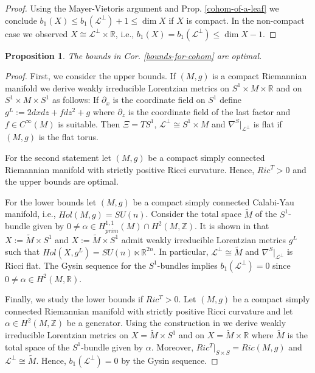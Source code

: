 \documentclass[a4paper,10pt,twoside]{amsart}
\newtheorem{proposition}[theorem]{Proposition}
\theoremstyle{definition}
\theoremstyle{remark}
\numberwithin{equation}{section}
\begin{document}
\begin{proof}
	Using the Mayer-Vietoris argument and Prop. \ref{cohom-of-a-leaf} we conclude $b_{1}(X) \leq b_{1}(\mathcal{L}^{\perp}) + 1 \leq \dim X$ if $X$
	is compact. In the non-compact case we observed $X \cong \mathcal{L}^{\perp} \times {\mathbb{R}}$, i.e.,
	$b_{1}(X) = b_{1}(\mathcal{L}^{\perp}) \leq \dim X -1$.
\end{proof}
\begin{proposition}
	The bounds in Cor. \ref{bounds-for-cohom} are optimal.
\end{proposition}
\begin{proof}
	First, we consider the upper bounds. If $(M,g)$ is a compact Riemannian manifold we derive weakly irreducible Lorentzian metrics on
	$S^{1} \times M \times {\mathbb{R}}$ and on $S^{1} \times M \times S^{1}$ as follows: If $\partial_{x}$ is the coordinate field on $S^{1}$ define
	$g^{L}:= 2dxdz +fdz^{2} + g$ where $\partial_{z}$ is the coordinate field of the last factor and $f \in C^{\infty}(M)$ is suitable.
	Then $\Xi = TS^{1}$, $\mathcal{L}^{\perp} \cong S^{1} \times M$ and $\nabla^{S}|_{\mathcal{L}^{\perp}}$ is flat if $(M,g)$ is the flat torus.\par
	For the second statement let $(M,g)$ be a compact simply connected Riemannian manifold with strictly positive Ricci curvature. Hence,
	$Ric^{T} > 0$ and the upper bounds are optimal.\par
	For the lower bounds let $(M,g)$ be a compact simply connected Calabi-Yau manifold, i.e., $Hol(M,g)=SU(n)$. Consider the total space
	$\tilde{M}$ of the $S^{1}$-bundle given by $0 \neq \alpha \in H^{1,1}_{prim}(M)\cap H^{2}(M,{\mathbb{Z}})$. It is shown in \cite[Cor. 4.4]{laerz-2008-a}
	that $X:= \tilde{M} \times S^{1}$ and $X:= \tilde{M} \times S^{1}$ admit weakly irreducible Lorentzian metrics $g^{L}$ such that
	$Hol(X,g^{L})= SU(n) \ltimes {\mathbb{R}}^{2n}$. In particular, $\mathcal{L}^{\perp} \cong \tilde{M}$ and $\nabla^{S}|_{\mathcal{L}^{\perp}}$ is Ricci
	flat. The Gysin sequence for the $S^{1}$-bundles implies $b_{1}(\mathcal{L}^{\perp})=0$ since $0 \neq \alpha \in H^{2}(M,{\mathbb{R}})$.\par
	Finally, we study the lower bounds if $Ric^{T}>0$. Let $(M,g)$ be a compact simply connected Riemannian manifold with strictly positive Ricci
	curvature and let $\alpha \in H^{2}(M,{\mathbb{Z}})$ be a generator. Using the construction in \cite{laerz-2008-a} we derive weakly irreducible Lorentzian
	metrics on $X= \tilde{M} \times S^{1}$ and on $X=\tilde{M} \times {\mathbb{R}}$ where $\tilde{M}$ is the total space of the $S^{1}$-bundle given by
	$\alpha$. Moreover, $Ric^{T}|_{S \times S} = Ric(M,g)$ and $\mathcal{L}^{\perp} \cong \tilde{M}$. Hence, $b_{1}(\mathcal{L}^{\perp})=0$ by the
	Gysin sequence.
\end{proof}
\end{document}
